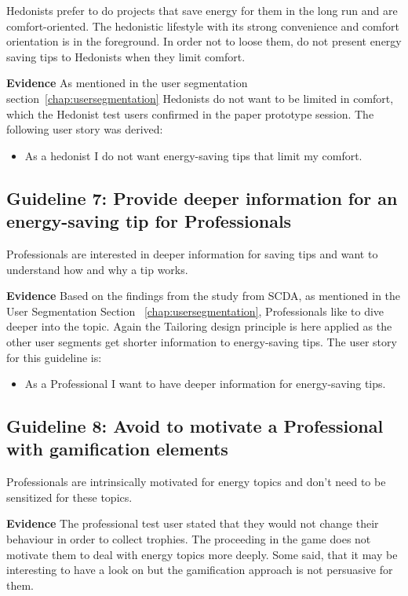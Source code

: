 Hedonists prefer to do projects that save energy for them in the long run and are comfort-oriented. The hedonistic lifestyle with its strong convenience and comfort orientation is in the foreground. In order not to loose them, do not present energy saving tips to Hedonists when they limit comfort.

\textbf{Evidence} \quad As mentioned in the user segmentation section~\ref{chap:usersegmentation} Hedonists do not want to be limited in comfort, which the Hedonist test users confirmed in the paper prototype session. The following user story was derived:

\begin{itemize}
	\item As a hedonist I do not want energy-saving tips that limit my comfort.
\end{itemize}

\subsection*{Guideline 7: Provide deeper information for an energy-saving tip for Professionals}

Professionals are interested in deeper information for saving tips and want to understand how and why a tip works.

\textbf{Evidence} \quad Based on the findings from the study from SCDA, as mentioned in the User Segmentation Section ~\ref{chap:usersegmentation}, Professionals like to dive deeper into the topic. Again the Tailoring design principle is here applied as the other user segments get shorter information to energy-saving tips. The user story for this guideline is:

\begin{itemize}
	\item As a Professional I want to have deeper information for energy-saving tips.
\end{itemize}


\subsection*{Guideline 8: Avoid to motivate a Professional with gamification elements}

Professionals are intrinsically motivated for energy topics and don't need to be sensitized for these topics.

\textbf{Evidence} \quad The professional test user stated that they would not change their behaviour in order to collect trophies. The proceeding in the game does not motivate them to deal with energy topics more deeply. Some said, that it may be interesting to have a look on but the gamification approach is not persuasive for them. 

